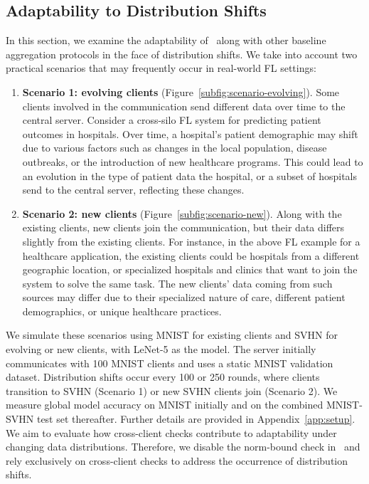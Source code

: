 



\subsection{Adaptability to Distribution Shifts}
\label{sec: empirical-adaptability}

In this section, we examine the adaptability of \ours~along with other baseline aggregation protocols in the face of distribution shifts.
We take into account two practical scenarios that may frequently occur in real-world FL settings:


\begin{enumerate}
    \item \textbf{Scenario 1: evolving clients} (Figure~\ref{subfig:scenario-evolving}).
    Some clients involved in the communication send different data over time to the central server. Consider a cross-silo FL system for predicting patient outcomes in hospitals. Over time, a hospital's patient demographic may shift due to various factors such as changes in the local population, disease outbreaks, or the introduction of new healthcare programs. This could lead to an evolution in the type of patient data the hospital, or a subset of hospitals send to the central server, reflecting these changes.

    \item \textbf{Scenario 2: new clients} (Figure~\ref{subfig:scenario-new}). Along with the existing clients, new clients join the communication, but their data differs slightly from the existing clients. For instance, in the above FL example for a healthcare application, the existing clients could be hospitals from a different geographic location, or specialized hospitals and clinics that want to join the system to solve the same task. The new clients' data coming from such sources may differ due to their specialized nature of care, different patient demographics, or unique healthcare practices.
\end{enumerate}

We simulate these scenarios using MNIST for existing clients and SVHN for evolving or new clients, with LeNet-5 as the model. The server initially communicates with 100 MNIST clients and uses a static MNIST validation dataset. Distribution shifts occur every 100 or 250 rounds, where clients transition to SVHN (Scenario 1) or new SVHN clients join (Scenario 2). We measure global model accuracy on MNIST initially and on the combined MNIST-SVHN test set thereafter. Further details are provided in Appendix~\ref{app:setup}.
We aim to evaluate how cross-client checks contribute to adaptability under changing data distributions. Therefore, we disable the norm-bound check in \ours~and rely exclusively on cross-client checks to address the occurrence of distribution shifts.


